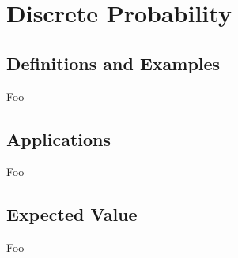 \section{Discrete Probability}

\subsection{Definitions and Examples}

Foo

\subsection{Applications}

Foo

\subsection{Expected Value}

Foo

